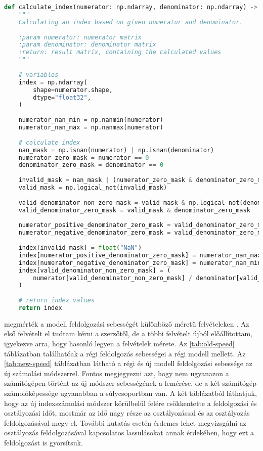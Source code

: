 
\begin{lstlisting}[language={Python}]
def calculate_index(numerator: np.ndarray, denominator: np.ndarray) -> np.ndarray:
    """
    Calculating an index based on given numerator and denominator.
    
    :param numerator: numerator matrix
    :param denominator: denominator matrix
    :return: result matrix, containing the calculated values
    """
    
    # variables
    index = np.ndarray(
        shape=numerator.shape,
        dtype="float32",
    )
    
    numerator_nan_min = np.nanmin(numerator)
    numerator_nan_max = np.nanmax(numerator)
    
    # calculate index
    nan_mask = np.isnan(numerator) | np.isnan(denominator)
    numerator_zero_mask = numerator == 0
    denominator_zero_mask = denominator == 0
    
    invalid_mask = nan_mask | (numerator_zero_mask & denominator_zero_mask)
    valid_mask = np.logical_not(invalid_mask)
    
    valid_denominator_non_zero_mask = valid_mask & np.logical_not(denominator_zero_mask)
    valid_denominator_zero_mask = valid_mask & denominator_zero_mask
    
    numerator_positive_denominator_zero_mask = valid_denominator_zero_mask & (numerator > 0)
    numerator_negative_denominator_zero_mask = valid_denominator_zero_mask & (numerator < 0)
    
    index[invalid_mask] = float("NaN")
    index[numerator_positive_denominator_zero_mask] = numerator_nan_max
    index[numerator_negative_denominator_zero_mask] = numerator_nan_min
    index[valid_denominator_non_zero_mask] = (
        numerator[valid_denominator_non_zero_mask] / denominator[valid_denominator_non_zero_mask]
    )
    
    # return index values
    return index
\end{lstlisting}

\citeauthor{magyar2023} megmérték a modell feldolgozási sebességét különböző méretű felvételeken \cite{magyar2023}. Az első felvételt el tudtam kérni a szerzőtől, de a többi felvételt újból előállítottam, igyekezve arra, hogy hasonló legyen a felvételek mérete. Az \ref{tab:old-speed} táblázatban találhatóak a régi feldolgozás sebességei a régi modell mellett. Az \ref{tab:new-speed} táblázatban látható a régi és új modell feldolgozási sebessége az új számolási módszerrel. Fontos megjegyezni azt, hogy nem ugyanazon a számítógépen történt az új módszer sebességének a lemérése, de a két számítógép számolóképessége ugyanabban a súlycsoportban van. A két táblázatból láthatjuk, hogy az új indexszámolási módszer körülbelül felére csökkentette a feldolgozási és osztályozási időt, mostmár az idő nagy része az osztályozással és az osztályozás feldolgozásával megy el. További kutatás esetén érdemes lehet megvizsgálni az osztályozás feldolgozásával kapcsolatos lassulásokat annak érdekében, hogy ezt a feldolgozást is gyorsítsuk.

